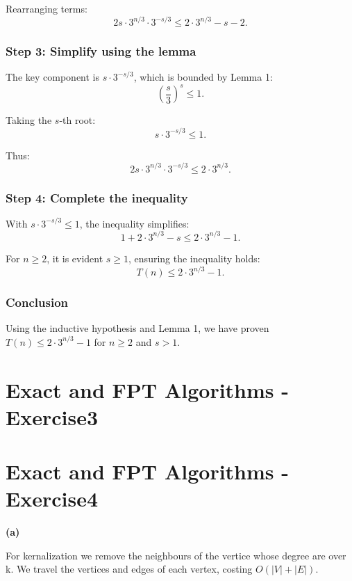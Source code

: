 \documentclass[12pt]{article}
\begin{document}
Rearranging terms:
\[
2s \cdot 3^{n/3} \cdot 3^{-s/3} \leq 2 \cdot 3^{n/3} - s - 2.
\]

\subsubsection*{Step 3: Simplify using the lemma}
The key component is \( s \cdot 3^{-s/3} \), which is bounded by Lemma 1:
\[
\left( \frac{s}{3} \right)^s \leq 1.
\]

Taking the \( s \)-th root:
\[
s \cdot 3^{-s/3} \leq 1.
\]

Thus:
\[
2s \cdot 3^{n/3} \cdot 3^{-s/3} \leq 2 \cdot 3^{n/3}.
\]

\subsubsection*{Step 4: Complete the inequality}
With \( s \cdot 3^{-s/3} \leq 1 \), the inequality simplifies:
\[
1 + 2 \cdot 3^{n/3} - s \leq 2 \cdot 3^{n/3} - 1.
\]

For \( n \geq 2 \), it is evident \( s \geq 1 \), ensuring the inequality holds:
\[
T(n) \leq 2 \cdot 3^{n/3} - 1.
\]

\subsubsection*{Conclusion}
Using the inductive hypothesis and Lemma 1, we have proven \( T(n) \leq 2 \cdot 3^{n/3} - 1 \) for \( n \geq 2 \) and \( s > 1 \).
\
\section{Exact and FPT Algorithms - Exercise3}

\section{Exact and FPT Algorithms - Exercise4}

\textbf{(a)}

For kernalization we remove the neighbours of the vertice whose degree are over k. We travel the vertices and edges of each vertex, costing $O(|V| + |E|)$. 
\end{document}
